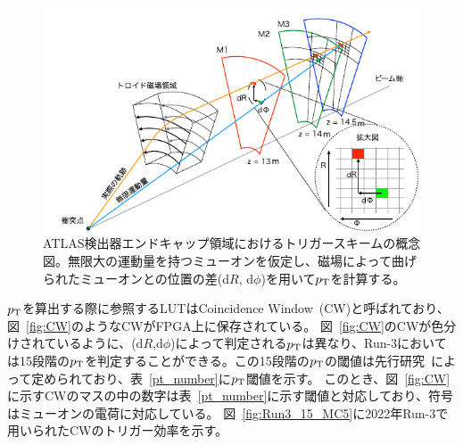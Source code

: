 \begin{figure}[tb]
  \centering
  \includegraphics[clip, width=15cm]{fig/3/akatuka_mt_trigger_sceme.pdf}
  \caption{ATLAS検出器エンドキャップ領域におけるトリガースキームの概念図\cite{article:akatsuka-mron}。無限大の運動量を持つミューオンを仮定し、磁場によって曲げられたミューオンとの位置の差(d$R$, d$\phi$)を用いて$p_{\rm{T}}$を計算する。}
  \label{fig:trigger-scheme}
\end{figure}


$p_{\rm{T}}$を算出する際に参照するLUTはCoincidence Window~(CW)と呼ばれており、図~\ref{fig:CW}のようなCWがFPGA上に保存されている。
図~\ref{fig:CW}のCWが色分けされているように、(d$R$,d$\phi$)によって判定される$p_{\rm{T}}$は異なり、Run-3においては15段階の$p_{\rm{T}}$を判定することができる。この15段階の$p_{\rm{T}}$の閾値は先行研究~\cite{article:shiomi-mron}によって定められており、表~\ref{pt_number}に$p_{\rm{T}}$閾値を示す。
このとき、図~\ref{fig:CW}に示すCWのマスの中の数字は表~\ref{pt_number}に示す閾値と対応しており、符号はミューオンの電荷に対応している。
図~\ref{fig:Run3_15_MC5}に2022年Run-3で用いられたCWのトリガー効率を示す。

